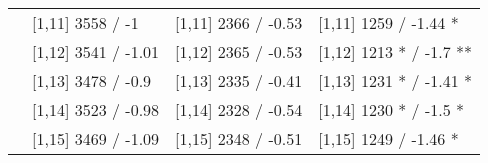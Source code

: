 \begin{table}
\begin{tabular}[t]{llll}
 & {}[1,11] 3558  / -1 & {}[1,11] 2366  / -0.53 & {}[1,11] 1259  / -1.44 *\\
 & {}[1,12] 3541  / -1.01 & {}[1,12] 2365  / -0.53 & {}[1,12] 1213 * / -1.7 **\\
\addlinespace
 & {}[1,13] 3478  / -0.9 & {}[1,13] 2335  / -0.41 & {}[1,13] 1231 * / -1.41 *\\
 & {}[1,14] 3523  / -0.98 & {}[1,14] 2328  / -0.54 & {}[1,14] 1230 * / -1.5 *\\
 & {}[1,15] 3469  / -1.09 & {}[1,15] 2348  / -0.51 & {}[1,15] 1249  / -1.46 *\\
\bottomrule
\end{tabular}
\end{table}
